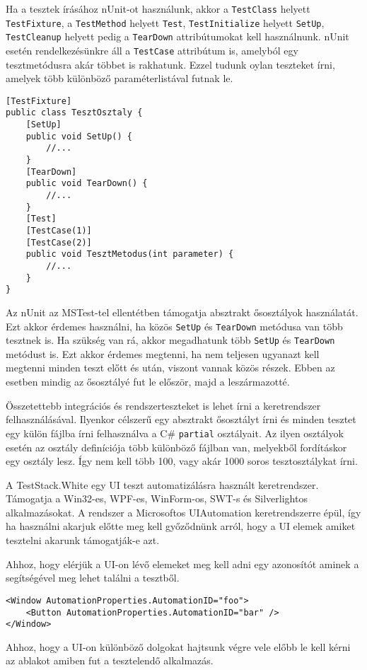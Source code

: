 \noindent Ha a tesztek írásához nUnit-ot használunk, akkor a \verb|TestClass| helyett \verb|TestFixture|, a \verb|TestMethod| helyett \verb|Test|, \verb|TestInitialize| helyett \verb|SetUp|, \verb|TestCleanup| helyett pedig a \verb|TearDown| attribútumokat kell használnunk. nUnit esetén rendelkezésünkre áll a \verb|TestCase| attribútum is, amelyból egy tesztmetódusra akár többet is rakhatunk. Ezzel tudunk oylan teszteket írni, amelyek több különböző paraméterlistával futnak le.

\begin{verbatim}
[TestFixture]
public class TesztOsztaly {
    [SetUp]
    public void SetUp() {
        //...
    }
    [TearDown]
    public void TearDown() {
        //...
    }
    [Test]
    [TestCase(1)]
    [TestCase(2)]
    public void TesztMetodus(int parameter) {
        //...
    }
}
\end{verbatim}

\noindent Az nUnit az MSTest-tel ellentétben támogatja absztrakt ősosztályok használatát. Ezt akkor érdemes használni, ha közös \verb|SetUp| és \verb|TearDown| metódusa van több tesztnek is. Ha szükség van rá, akkor megadhatunk több \verb|SetUp| és \verb|TearDown| metódust is. Ezt akkor érdemes megtenni, ha nem teljesen ugyanazt kell megtenni minden teszt előtt és után, viszont vannak közös részek. Ebben az esetben mindig az ősosztályé fut le először, majd a leszármazotté.

\noindent Összetettebb integrációs és rendszerteszteket is lehet írni a keretrendszer felhasználásával. Ilyenkor célszerű egy absztrakt ősosztályt írni és minden tesztet egy külön fájlba írni felhasználva a C\# \verb|partial| osztályait. Az ilyen osztályok esetén az osztály definíciója több különböző fájlban van, melyekből fordításkor egy osztály lesz. Így nem kell több 100, vagy akár 1000 soros tesztosztálykat írni.

A TestStack.White egy UI teszt automatizálásra használt keretrendszer. Támogatja a Win32-es, WPF-es, WinForm-os, SWT-s és Silverlightos alkalmazásokat. A rendszer a Microsoftos UIAutomation keretrendszerre épül, így ha használni akarjuk előtte meg kell győződnünk arról, hogy a UI elemek amiket tesztelni akarunk támogatják-e azt.

\noindent Ahhoz, hogy elérjük a UI-on lévő elemeket meg kell adni egy azonosítót aminek a segítségével meg lehet találni a tesztből.

\begin{verbatim}
<Window AutomationProperties.AutomationID="foo">
    <Button AutomationProperties.AutomationID="bar" />
</Window>
\end{verbatim}
\noindent Ahhoz, hogy a UI-on különböző dolgokat hajtsunk végre vele előbb le kell kérni az ablakot amiben fut a tesztelendő alkalmazás.

